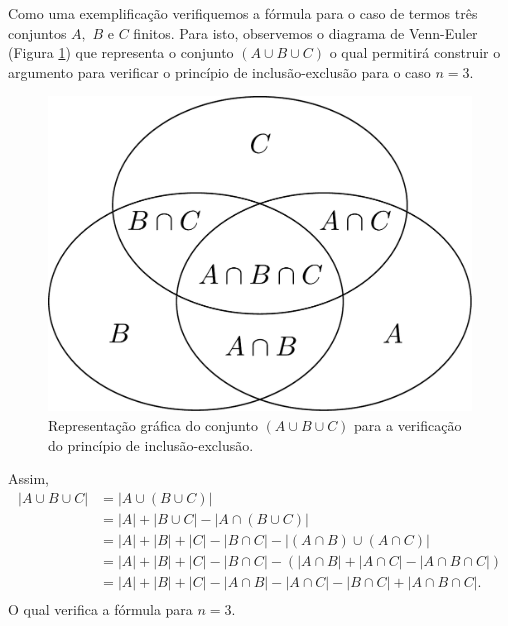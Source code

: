\begin{frame}
Como uma exemplificação verifiquemos a fórmula para o caso de termos três conjuntos $A,$ $B$ e $C$ finitos.  Para isto, observemos o diagrama de Venn-Euler (Figura \ref{fig3}) que representa o conjunto $(A \cup B \cup C)$ o qual permitirá construir o argumento para verificar o princípio de inclusão-exclusão para o caso $n=3.$

\begin{figure}[!htb]
\begin{center}
\includegraphics[angle=0, scale=0.22]{fig3.pdf}
\caption{\label{fig3}  Representação gráfica do conjunto $(A \cup B \cup C)$ para a verificação do princípio de inclusão-exclusão.}
\end{center}
\end{figure} 
Assim, 
$$
\begin{aligned}
|A \cup B \cup C| &= |A \cup (B \cup C)| \\
&= |A| + |B \cup C| - |A \cap (B \cup C)| \\
&= |A| + |B| + |C| - |B \cap C| - |(A \cap B) \cup (A \cap C)| \\
&= |A| + |B| + |C| - |B \cap C| - (|A \cap B| + |A \cap C| - |A \cap B \cap C|) \\
&= |A| + |B| + |C| - |A \cap B| - |A \cap C| - |B \cap C| + |A\cap  B \cap C|. \\
\end{aligned}
$$
O qual verifica a fórmula para $n=3.$
\end{frame}

